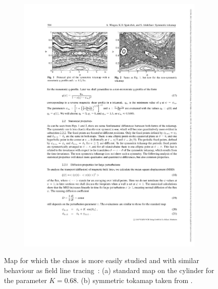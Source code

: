 \begin{figure}[h!]
\begin{subfigure}[t]{0.56\textwidth}
        \includegraphics[width=\textwidth]{images/intro/tokamap.pdf}
        \caption{}
        \label{fig:tokamap}
    \end{subfigure}
    \caption{Map for which the chaos is more easily studied and with similar behaviour as field line tracing~: (a) standard map on the cylinder for the parameter $K=0.68$. (b) symmetric tokamap taken from \cite{wingen_stochastic_2005}.}
    \label{fig:mapping-the-chaos}
\end{figure}

